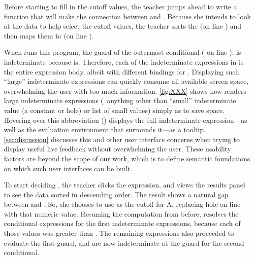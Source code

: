 %
%
Before starting to fill in the cutoff values, the teacher jumps ahead to write a
function  that will make the connection between 
and .
%
Because she intends to look at the data to help select the cutoff values, the
teacher sorts the  (on line ) and then maps
them to  (on line ).

When \Hazel{} runs this program, the guard of the outermost conditional
( on line ), is indeterminate because 
is.
%
Therefore, each of the indeterminate expressions in  is the
entire expression body, albeit with different bindings for .
%
Displaying such ``large'' indeterminate expressions can quickly consume all
available screen space, overwhelming the user with too much information.
%
\autoref{fig:XXX} shows how \Hazel{} renders large indeterminate
expressions (\ie{}~anything other than ``small'' indeterminate value (a constant
or hole) or list of small values) simply as  to save space.
%
Hovering over this abbreviation () displays the full
indeterminate expression---as well as the evaluation environment that surrounds
it---as a tooltip.
%
\autoref{sec:discussion} discusses this and other user interface concerns when
trying to display useful live feedback without overwhelming the user.
%
These usability factors are beyond the scope of our work, which is to define
semantic foundations on which such user interfaces can be built.

To start deciding , the teacher clicks the 
expression, and views the results panel to see the data sorted in descending
order.
%
The result shows a natural gap between  and .
%
So, she chooses to use  as the cutoff for A, replacing hole  on
line  with that numeric value.
%
Resuming the computation from before, \Hazel{} resolves the conditional
expressions for the first  indeterminate expressions, because each of
those  values was greater than .
%
The remaining  expressions also proceeded to evaluate the first guard,
and are now indeterminate at the guard for the second conditional.

